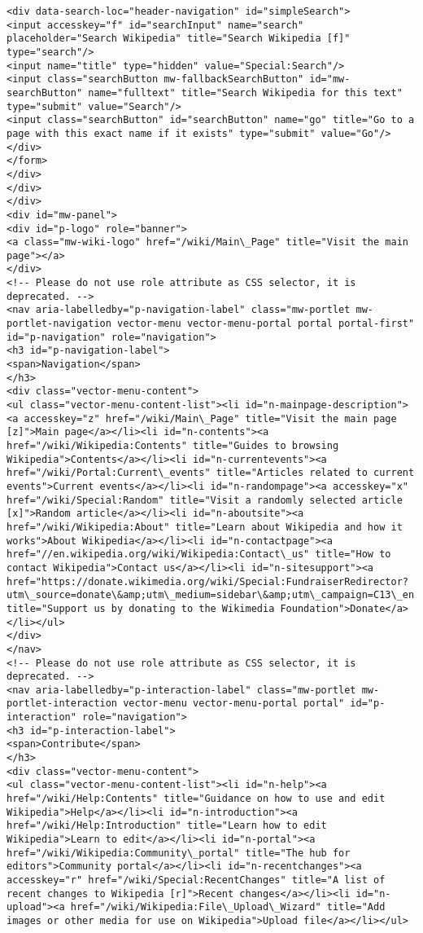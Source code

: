 \documentclass[11pt]{article}
\begin{document}
\begin{Verbatim}[commandchars=\\\{\}]
<div data-search-loc="header-navigation" id="simpleSearch">
<input accesskey="f" id="searchInput" name="search" placeholder="Search Wikipedia" title="Search Wikipedia [f]" type="search"/>
<input name="title" type="hidden" value="Special:Search"/>
<input class="searchButton mw-fallbackSearchButton" id="mw-searchButton" name="fulltext" title="Search Wikipedia for this text" type="submit" value="Search"/>
<input class="searchButton" id="searchButton" name="go" title="Go to a page with this exact name if it exists" type="submit" value="Go"/>
</div>
</form>
</div>
</div>
</div>
<div id="mw-panel">
<div id="p-logo" role="banner">
<a class="mw-wiki-logo" href="/wiki/Main\_Page" title="Visit the main page"></a>
</div>
<!-- Please do not use role attribute as CSS selector, it is deprecated. -->
<nav aria-labelledby="p-navigation-label" class="mw-portlet mw-portlet-navigation vector-menu vector-menu-portal portal portal-first" id="p-navigation" role="navigation">
<h3 id="p-navigation-label">
<span>Navigation</span>
</h3>
<div class="vector-menu-content">
<ul class="vector-menu-content-list"><li id="n-mainpage-description"><a accesskey="z" href="/wiki/Main\_Page" title="Visit the main page [z]">Main page</a></li><li id="n-contents"><a href="/wiki/Wikipedia:Contents" title="Guides to browsing Wikipedia">Contents</a></li><li id="n-currentevents"><a href="/wiki/Portal:Current\_events" title="Articles related to current events">Current events</a></li><li id="n-randompage"><a accesskey="x" href="/wiki/Special:Random" title="Visit a randomly selected article [x]">Random article</a></li><li id="n-aboutsite"><a href="/wiki/Wikipedia:About" title="Learn about Wikipedia and how it works">About Wikipedia</a></li><li id="n-contactpage"><a href="//en.wikipedia.org/wiki/Wikipedia:Contact\_us" title="How to contact Wikipedia">Contact us</a></li><li id="n-sitesupport"><a href="https://donate.wikimedia.org/wiki/Special:FundraiserRedirector?utm\_source=donate\&amp;utm\_medium=sidebar\&amp;utm\_campaign=C13\_en.wikipedia.org\&amp;uselang=en" title="Support us by donating to the Wikimedia Foundation">Donate</a></li></ul>
</div>
</nav>
<!-- Please do not use role attribute as CSS selector, it is deprecated. -->
<nav aria-labelledby="p-interaction-label" class="mw-portlet mw-portlet-interaction vector-menu vector-menu-portal portal" id="p-interaction" role="navigation">
<h3 id="p-interaction-label">
<span>Contribute</span>
</h3>
<div class="vector-menu-content">
<ul class="vector-menu-content-list"><li id="n-help"><a href="/wiki/Help:Contents" title="Guidance on how to use and edit Wikipedia">Help</a></li><li id="n-introduction"><a href="/wiki/Help:Introduction" title="Learn how to edit Wikipedia">Learn to edit</a></li><li id="n-portal"><a href="/wiki/Wikipedia:Community\_portal" title="The hub for editors">Community portal</a></li><li id="n-recentchanges"><a accesskey="r" href="/wiki/Special:RecentChanges" title="A list of recent changes to Wikipedia [r]">Recent changes</a></li><li id="n-upload"><a href="/wiki/Wikipedia:File\_Upload\_Wizard" title="Add images or other media for use on Wikipedia">Upload file</a></li></ul>

\end{Verbatim}
\end{document}
